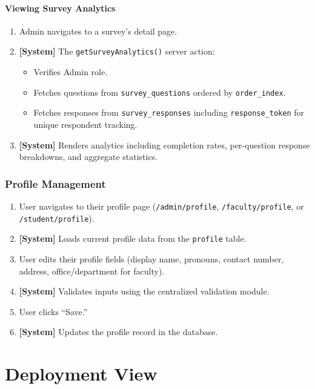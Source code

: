 \documentclass[11pt,a4paper]{article}
\begin{document}
\paragraph{Viewing Survey Analytics}
\begin{enumerate}[leftmargin=1.5em]
  \item Admin navigates to a survey's detail page.
  \item \textbf{[System]} The \texttt{getSurveyAnalytics()} server action:
    \begin{itemize}
      \item Verifies Admin role.
      \item Fetches questions from \texttt{survey\_questions} ordered by \texttt{order\_index}.
      \item Fetches responses from \texttt{survey\_responses} including \texttt{response\_token} for unique respondent tracking.
    \end{itemize}
  \item \textbf{[System]} Renders analytics including completion rates, per-question response breakdowns, and aggregate statistics.
\end{enumerate}


\subsubsection{Profile Management}

\begin{enumerate}[leftmargin=1.5em]
  \item User navigates to their profile page (\texttt{/admin/profile}, \texttt{/faculty/profile}, or \texttt{/student/profile}).
  \item \textbf{[System]} Loads current profile data from the \texttt{profile} table.
  \item User edits their profile fields (display name, pronouns, contact number, address, office/department for faculty).
  \item \textbf{[System]} Validates inputs using the centralized validation module.
  \item User clicks ``Save.''
  \item \textbf{[System]} Updates the profile record in the database.
\end{enumerate}


\section{Deployment View}
\label{sec:deployment_view}
\end{document}
